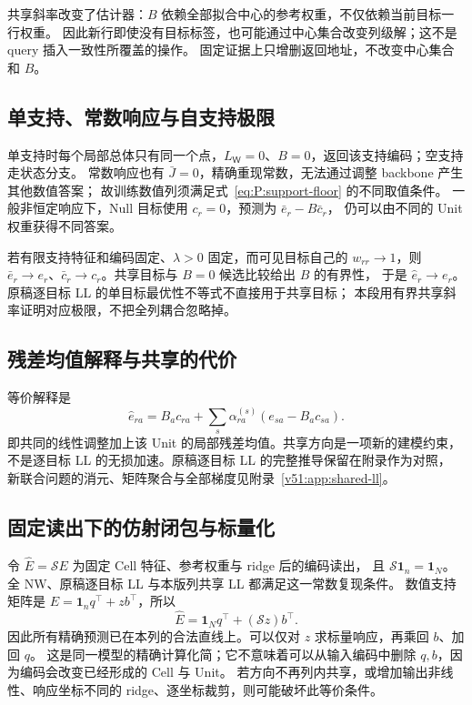 \documentclass[11pt,UTF8,fontset=fandol]{ctexart}
\numberwithin{equation}{section}
\theoremstyle{definition}
\begin{document}
共享斜率改变了估计器：$B$ 依赖全部拟合中心的参考权重，不仅依赖当前目标一行权重。
因此新行即使没有目标标签，也可能通过中心集合改变列级解；这不是 query 插入一致性所覆盖的操作。
固定证据上只增删返回地址，不改变中心集合和 $B$。

\subsection{单支持、常数响应与自支持极限}
单支持时每个局部总体只有同一个点，$L_{\mathsf W}=0$、$B=0$，返回该支持编码；空支持走状态分支。
常数响应也有 $\bar J=0$，精确重现常数，无法通过调整 backbone 产生其他数值答案；
故训练数值列须满足式~\eqref{eq:P:support-floor} 的不同取值条件。
一般非恒定响应下，Null 目标使用 $c_r=0$，预测为 $\bar e_r-B\bar c_r$，
仍可以由不同的 Unit 权重获得不同答案。

若有限支持特征和编码固定、$\lambda>0$ 固定，而可见目标自己的 $w_{rr}\to1$，则
$\bar e_r\to e_r$、$\bar c_r\to c_r$。共享目标与 $B=0$ 候选比较给出 $B$ 的有界性，
于是 $\widehat e_r\to e_r$。原稿逐目标 LL 的单目标最优性不等式不直接用于共享目标；
本段用有界共享斜率证明对应极限，不把全列耦合忽略掉。

\subsection{残差均值解释与共享的代价}
等价解释是
\begin{equation}
 \widehat e_{ra}=B_ac_{ra}+\sum_s\alpha_{ra}^{(s)}(e_{sa}-B_ac_{sa}).
 \label{v51:eq:local-residual}
\end{equation}
即共同的线性调整加上该 Unit 的局部残差均值。共享方向是一项新的建模约束，
不是逐目标 LL 的无损加速。原稿逐目标 LL 的完整推导保留在附录作为对照，
新联合问题的消元、矩阵聚合与全部梯度见附录~\ref{v51:app:shared-ll}。

\subsection{固定读出下的仿射闭包与标量化}
令 $\widehat E=\mathcal S E$ 为固定 Cell 特征、参考权重与 ridge 后的编码读出，
且 $\mathcal S\bm1_n=\bm1_N$。全 NW、原稿逐目标 LL 与本版列共享 LL 都满足这一常数复现条件。
数值支持矩阵是 $E=\bm1_nq^\top+z b^\top$，所以
\begin{equation}
 \boxed{\widehat E=\bm1_Nq^\top+(\mathcal S z)b^\top.}
 \label{v51:eq:affine-closure}
\end{equation}
因此所有精确预测已在本列的合法直线上。可以仅对 $z$ 求标量响应，再乘回 $b$、加回 $q$。
这是同一模型的精确计算化简；它不意味着可以从输入编码中删除 $q,b$，因为编码会改变已经形成的 Cell 与 Unit。
若方向不再列内共享，或增加输出非线性、响应坐标不同的 ridge、逐坐标裁剪，则可能破坏此等价条件。
\end{document}
